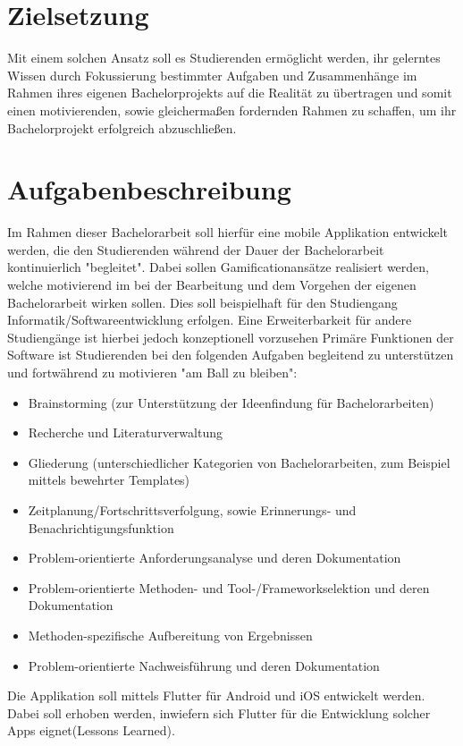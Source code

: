 \documentclass[bibliography=totoc,listof=totoc,BCOR=5mm,DIV=12,oneside]{scrbook}
\begin{document}
\section{Zielsetzung}
Mit einem solchen Ansatz soll es Studierenden ermöglicht werden, ihr gelerntes Wissen durch Fokussierung bestimmter Aufgaben und Zusammenhänge im Rahmen ihres eigenen Bachelorprojekts auf die Realität zu übertragen und somit einen motivierenden, sowie gleichermaßen fordernden Rahmen zu schaffen, um ihr Bachelorprojekt erfolgreich abzuschließen.

\section{Aufgabenbeschreibung}
Im Rahmen dieser Bachelorarbeit soll hierfür eine mobile Applikation entwickelt werden, die den Studierenden während der Dauer der Bachelorarbeit kontinuierlich  "begleitet". Dabei sollen Gamificationansätze realisiert werden, welche motivierend im bei der Bearbeitung und dem Vorgehen der eigenen Bachelorarbeit wirken sollen. Dies soll beispielhaft für den Studiengang Informatik/Softwareentwicklung erfolgen. Eine Erweiterbarkeit für andere Studiengänge ist hierbei jedoch konzeptionell vorzusehen
Primäre Funktionen der Software ist Studierenden bei den folgenden Aufgaben begleitend zu unterstützen und fortwährend zu motivieren "am Ball zu bleiben":
\begin{itemize}
\item Brainstorming (zur Unterstützung der Ideenfindung für Bachelorarbeiten)
\item Recherche und Literaturverwaltung
\item Gliederung (unterschiedlicher Kategorien von Bachelorarbeiten, zum Beispiel mittels bewehrter Templates)
\item Zeitplanung/Fortschrittsverfolgung, sowie Erinnerungs- und Benachrichtigungsfunktion 
\item Problem-orientierte Anforderungsanalyse und deren Dokumentation
\item Problem-orientierte Methoden- und Tool-/Frameworkselektion und deren Dokumentation
\item Methoden-spezifische Aufbereitung von Ergebnissen
\item Problem-orientierte Nachweisführung und deren Dokumentation
\end{itemize}
Die Applikation soll mittels Flutter für Android und iOS entwickelt werden. Dabei soll erhoben werden, inwiefern sich Flutter für die Entwicklung solcher Apps eignet(Lessons Learned). 
\end{document}
